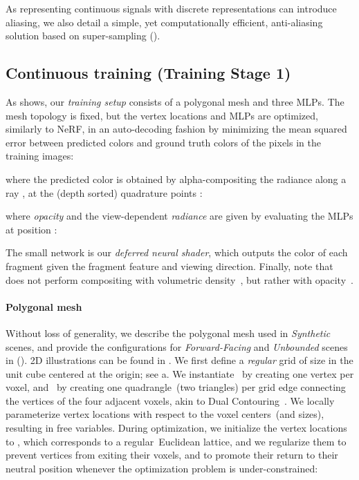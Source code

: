 As representing continuous signals with discrete representations can introduce aliasing, we also detail a simple, yet computationally efficient, anti-aliasing solution based on super-sampling ().


\subsection{Continuous training (Training Stage 1)}
\label{sec:stage1}
As  shows, our \textit{training setup} consists of a polygonal mesh  and three MLPs.
The mesh topology  is fixed, but the vertex locations  and MLPs are optimized, similarly to NeRF, in an auto-decoding fashion by minimizing the mean squared error between predicted colors and ground truth colors of the pixels in the training images\floatersfootnote{}:

where the predicted color  is obtained by alpha-compositing the radiance  along a ray , at the (depth sorted) quadrature points :

where \textit{opacity}  and the view-dependent \textit{radiance}  are given by evaluating the MLPs at position :

The small network  is our \textit{deferred neural shader}, which outputs the color of each fragment given the fragment feature and viewing direction.
Finally, note that  does not perform compositing with volumetric density~\cite{mildenhall2020nerf}, but rather with opacity~\cite[Eq.8]{attal2022learning}.


\paragraph{Polygonal mesh} 
Without loss of generality, we describe the polygonal mesh used in \textit{Synthetic } scenes, and provide the configurations for \textit{Forward-Facing} and \textit{Unbounded } scenes in \SupplementaryMaterial (). 2D illustrations can be found in .
We first define a \textit{regular} grid  of size  in the unit cube centered at the origin; see a.
We instantiate~ by creating one vertex per voxel, and~ by creating one quadrangle~(two triangles) per grid edge connecting the vertices of the four adjacent voxels, akin to Dual Contouring~\cite{ju2002dual,chen2022ndc}.
We locally parameterize vertex locations with respect to the voxel centers~(and sizes), resulting in  free variables.
During optimization, we initialize the vertex locations to , which corresponds to a regular~Euclidean lattice, and 
we regularize them to prevent vertices from exiting their voxels, and to promote their return to their neutral position whenever the optimization problem is under-constrained:

